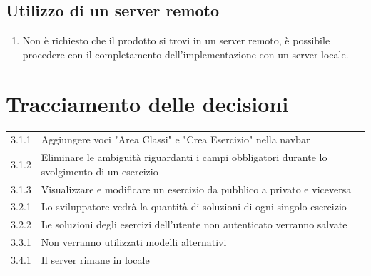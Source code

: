 \documentclass[11pt,a4paper]{article}
\begin{document}
	\subsection{Utilizzo di un server remoto}
	\begin{enumerate}
	\item Non è richiesto che il prodotto si trovi in un server remoto, è possibile procedere con il completamento dell'implementazione con un server locale.
\end{enumerate} 
	\section{Tracciamento delle decisioni}
	
	\begin{tabular}{|l|l|}\hline
		3.1.1 & Aggiungere voci "Area Classi" e "Crea Esercizio" nella navbar\\
		3.1.2 & Eliminare le ambiguità riguardanti i campi obbligatori durante lo svolgimento di un esercizio\\
		3.1.3 & Visualizzare e modificare un esercizio da pubblico a privato e viceversa \\
		3.2.1 & Lo sviluppatore vedrà la quantità di soluzioni di ogni singolo esercizio \\ 
		3.2.2 & Le soluzioni degli esercizi dell'utente non autenticato verranno salvate \\ 
		3.3.1 & Non verranno utilizzati modelli alternativi \\ 
		3.4.1 & Il server rimane in locale\\
		\hline 
	\end{tabular}
	
\end{document}
